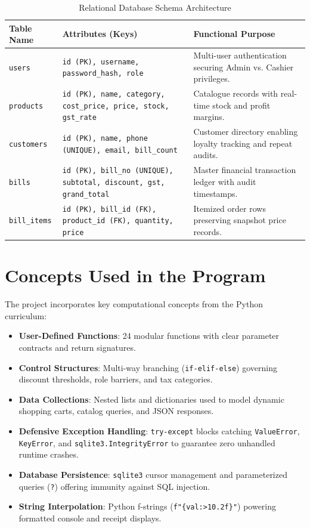 \documentclass[12pt,a4paper]{article}
\begin{document}
\begin{table}[htbp]
    \centering
    \caption{Relational Database Schema Architecture}
    \label{tab:schema}
    \begin{tabularx}{\textwidth}{l p{5cm} X}
        \toprule
        \textbf{Table Name} & \textbf{Attributes (Keys)} & \textbf{Functional Purpose} \\
        \midrule
        \texttt{users} & \texttt{id (PK), username, password\_hash, role} & Multi-user authentication securing Admin vs. Cashier privileges. \\
        \texttt{products} & \texttt{id (PK), name, category, cost\_price, price, stock, gst\_rate} & Catalogue records with real-time stock and profit margins. \\
        \texttt{customers} & \texttt{id (PK), name, phone (UNIQUE), email, bill\_count} & Customer directory enabling loyalty tracking and repeat audits. \\
        \texttt{bills} & \texttt{id (PK), bill\_no (UNIQUE), subtotal, discount, gst, grand\_total} & Master financial transaction ledger with audit timestamps. \\
        \texttt{bill\_items} & \texttt{id (PK), bill\_id (FK), product\_id (FK), quantity, price} & Itemized order rows preserving snapshot price records. \\
        \bottomrule
    \end{tabularx}
\end{table}

\section{Concepts Used in the Program}
The project incorporates key computational concepts from the Python curriculum:
\begin{itemize}
    \item \textbf{User-Defined Functions}: 24 modular functions with clear parameter contracts and return signatures.
    \item \textbf{Control Structures}: Multi-way branching (\texttt{if-elif-else}) governing discount thresholds, role barriers, and tax categories.
    \item \textbf{Data Collections}: Nested lists and dictionaries used to model dynamic shopping carts, catalog queries, and JSON responses.
    \item \textbf{Defensive Exception Handling}: \texttt{try-except} blocks catching \texttt{ValueError}, \texttt{KeyError}, and \texttt{sqlite3.IntegrityError} to guarantee zero unhandled runtime crashes.
    \item \textbf{Database Persistence}: \texttt{sqlite3} cursor management and parameterized queries (\texttt{?}) offering immunity against SQL injection.
    \item \textbf{String Interpolation}: Python f-strings (\texttt{f"\{val:>10.2f\}"}) powering formatted console and receipt displays.
\end{itemize}
\end{document}
